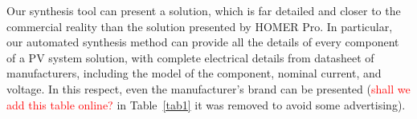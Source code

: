 \documentclass[runningheads]{llncs}
\begin{document}
Our synthesis tool can present a solution, which is far detailed and closer to the commercial reality than the solution presented by HOMER Pro. In particular, our automated synthesis method can provide all the details of every component of a PV system solution, with complete electrical details from datasheet of manufacturers, including the model of the component, nominal current, and voltage. In this respect, even the manufacturer's brand can be presented (\textcolor{red}{shall we add this table online?} in Table~\ref{tab1} it was removed to avoid some advertising).
%
%


%
\end{document}
